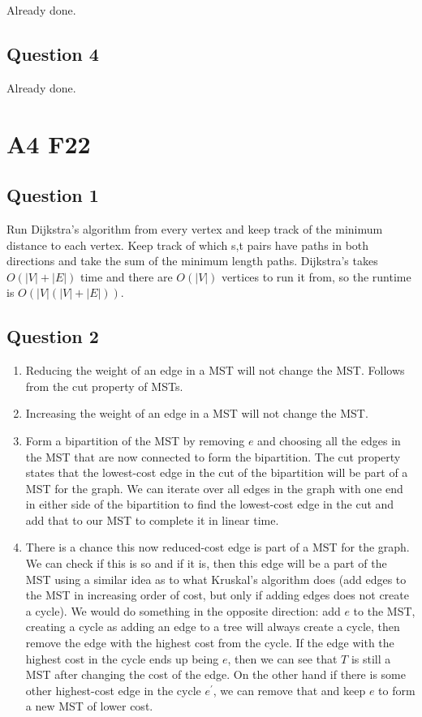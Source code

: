 \documentclass[11pt]{article}
\begin{document}
Already done.

\subsection{Question 4}

Already done.

\section{A4 F22}

\subsection{Question 1}

Run Dijkstra's algorithm from every vertex and keep track of the minimum distance to each vertex. Keep track of which s,t pairs have paths in both directions and take the sum of the minimum length paths. Dijkstra's takes $O(|V| + |E|)$ time and there are $O(|V|)$ vertices to run it from, so the runtime is $O(|V|(|V| + |E|))$.

\subsection{Question 2}

\begin{enumerate}
    \item Reducing the weight of an edge in a MST will not change the MST. Follows from the cut property of MSTs.
    \item Increasing the weight of an edge in a MST will not change the MST.
    \item Form a bipartition of the MST by removing $e$ and choosing all the edges in the MST that are now connected to form the bipartition. The cut property states that the lowest-cost edge in the cut of the bipartition will be part of a MST for the graph. We can iterate over all edges in the graph with one end in either side of the bipartition to find the lowest-cost edge in the cut and add that to our MST to complete it in linear time.
    \item There is a chance this now reduced-cost edge is part of a MST for the graph. We can check if this is so and if it is, then this edge will be a part of the MST using a similar idea as to what Kruskal's algorithm does (add edges to the MST in increasing order of cost, but only if adding edges does not create a cycle). We would do something in the opposite direction: add $e$ to the MST, creating a cycle as adding an edge to a tree will always create a cycle, then remove the edge with the highest cost from the cycle. If the edge with the highest cost in the cycle ends up being $e$, then we can see that $T$ is still a MST after changing the cost of the edge. On the other hand if there is some other highest-cost edge in the cycle $e^\prime$, we can remove that and keep $e$ to form a new MST of lower cost.
\end{enumerate}
\end{document}
